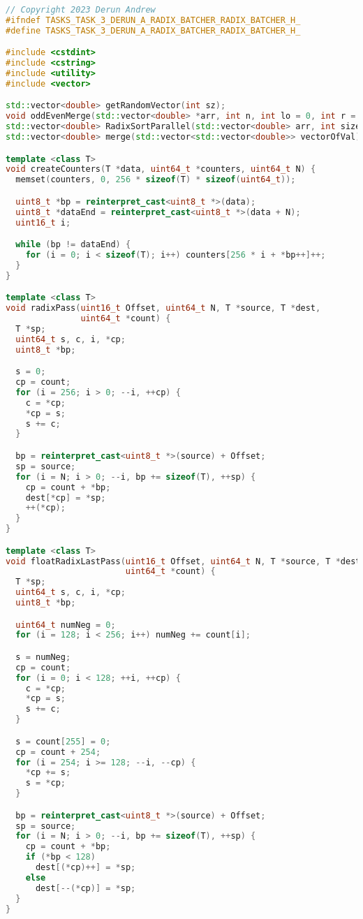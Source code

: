 \documentclass{report}
\begin{document}
\begin{lstlisting}[language=C++]
// Copyright 2023 Derun Andrew
#ifndef TASKS_TASK_3_DERUN_A_RADIX_BATCHER_RADIX_BATCHER_H_
#define TASKS_TASK_3_DERUN_A_RADIX_BATCHER_RADIX_BATCHER_H_

#include <cstdint>
#include <cstring>
#include <utility>
#include <vector>

std::vector<double> getRandomVector(int sz);
void oddEvenMerge(std::vector<double> *arr, int n, int lo = 0, int r = 1);
std::vector<double> RadixSortParallel(std::vector<double> arr, int size);
std::vector<double> merge(std::vector<std::vector<double>> vectorOfVal);

template <class T>
void createCounters(T *data, uint64_t *counters, uint64_t N) {
  memset(counters, 0, 256 * sizeof(T) * sizeof(uint64_t));

  uint8_t *bp = reinterpret_cast<uint8_t *>(data);
  uint8_t *dataEnd = reinterpret_cast<uint8_t *>(data + N);
  uint16_t i;

  while (bp != dataEnd) {
    for (i = 0; i < sizeof(T); i++) counters[256 * i + *bp++]++;
  }
}

template <class T>
void radixPass(uint16_t Offset, uint64_t N, T *source, T *dest,
               uint64_t *count) {
  T *sp;
  uint64_t s, c, i, *cp;
  uint8_t *bp;

  s = 0;
  cp = count;
  for (i = 256; i > 0; --i, ++cp) {
    c = *cp;
    *cp = s;
    s += c;
  }

  bp = reinterpret_cast<uint8_t *>(source) + Offset;
  sp = source;
  for (i = N; i > 0; --i, bp += sizeof(T), ++sp) {
    cp = count + *bp;
    dest[*cp] = *sp;
    ++(*cp);
  }
}

template <class T>
void floatRadixLastPass(uint16_t Offset, uint64_t N, T *source, T *dest,
                        uint64_t *count) {
  T *sp;
  uint64_t s, c, i, *cp;
  uint8_t *bp;

  uint64_t numNeg = 0;
  for (i = 128; i < 256; i++) numNeg += count[i];

  s = numNeg;
  cp = count;
  for (i = 0; i < 128; ++i, ++cp) {
    c = *cp;
    *cp = s;
    s += c;
  }

  s = count[255] = 0;
  cp = count + 254;
  for (i = 254; i >= 128; --i, --cp) {
    *cp += s;
    s = *cp;
  }

  bp = reinterpret_cast<uint8_t *>(source) + Offset;
  sp = source;
  for (i = N; i > 0; --i, bp += sizeof(T), ++sp) {
    cp = count + *bp;
    if (*bp < 128)
      dest[(*cp)++] = *sp;
    else
      dest[--(*cp)] = *sp;
  }
}


\end{lstlisting}
\end{document}
